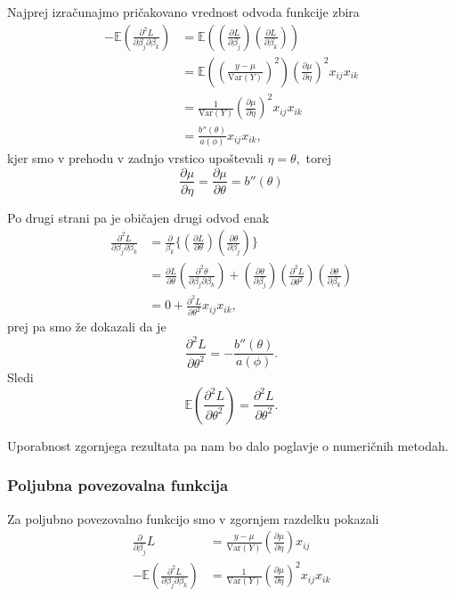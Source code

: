 \documentclass[12pt,a4paper]{amsart}
\theoremstyle{definition} %
\theoremstyle{plain} %
\begin{document}
Najprej izračunajmo pričakovano vrednost odvoda funkcije zbira
\begin{align*}
    -\mathbb{E}(\frac{\partial^2 L}{\partial\beta_{j}\partial\beta_{k}}) &= \mathbb{E}((\frac{\partial L}{\partial \beta_{j}})(\frac{\partial L}{\partial \beta_{k}})) \\
    &= \mathbb{E}\left(\left(\frac{y-\mu}{\mathrm{Var}(Y)}\right)^{2}\right)(\frac{\partial\mu}{\partial\eta})^{2}x_{ij}x_{ik} \\
    &= \frac{1}{\mathrm{Var}(Y)}(\frac{\partial\mu}{\partial\eta})^{2}x_{ij}x_{ik} \\
    &= \frac{b''(\theta)}{a(\phi)}x_{ij}x_{ik},
\end{align*}
kjer smo v prehodu v zadnjo vrstico upoštevali $\eta = \theta,$ torej 
\[
    \frac{\partial \mu}{\partial\eta} = \frac{\partial\mu}{\partial\theta} = b''(\theta)
\]

Po drugi strani pa je običajen drugi odvod enak
\begin{align*}    
    \frac{\partial^2L}{\partial\beta_{j}\partial\beta_{k}} &= \frac{\partial}{\beta_{k}}\{\left(\frac{\partial L}{\partial\theta}\right)\left(\frac{\partial \theta}{\partial\beta_{j}}\right)\}\\
    &= \frac{\partial L}{\partial\theta}\left(\frac{\partial^2\theta}{\partial\beta_{j}\partial\beta_{k}}\right) + \left(\frac{\partial\theta}{\partial\beta_{j}}\right)\left(\frac{\partial^2L}{\partial\theta^2}\right)\left(\frac{\partial\theta}{\partial\beta_{k}}\right) \\
    &= 0 + \frac{\partial^2L}{\partial\theta^2}x_{ij}x_{ik},
\end{align*}
prej pa smo že dokazali da je
\[
    \frac{\partial^2L}{\partial\theta^2} = -\frac{b''(\theta)}{a(\phi)}.
\]
Sledi
\begin{equation}\label{pv2odv}    
    \mathbb{E}\left(\frac{\partial^2L}{\partial\theta^2}\right) = \frac{\partial^2L}{\partial\theta^2}.
\end{equation}

Uporabnost zgornjega rezultata pa nam bo dalo poglavje o numeričnih metodah.

\subsubsection{Poljubna povezovalna funkcija}
Za poljubno povezovalno funkcijo smo v zgornjem razdelku pokazali
\begin{align*}    
    \frac{\partial}{\partial\beta_{j}}L &= \frac{y-\mu}{\mathrm{Var}(Y)}\left(\frac{\partial\mu}{\partial\eta}\right)x_{ij}\\
    -\mathbb{E}(\frac{\partial^2L}{\partial\beta_{j}\partial\beta_{k}}) &= \frac{1}{\mathrm{Var}(Y)}\left(\frac{\partial\mu}{\partial\eta}\right)^2x_{ij}x_{ik}
\end{align*}
\end{document}
